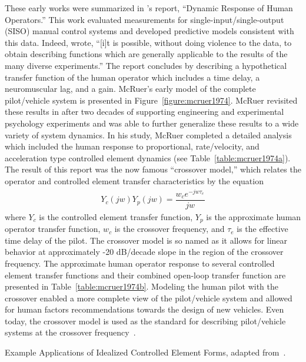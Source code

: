 These early works were summarized in \citeauthor{mcruer_dynamic_1957}'s report, ``Dynamic Response of Human Operators.''
This work evaluated measurements for single-input/single-output (SISO) manual control systems and developed predictive models consistent with this data.
Indeed, \citeauthor*{mcruer_dynamic_1957} wrote, ``[i]t is possible, without doing violence to the data, to obtain describing functions which are generally applicable to the results of the many diverse experiments.''
The report concludes by describing a hypothetical transfer function of the human operator which includes a time delay, a neuromuscular lag, and a gain.
McRuer's early model of the complete pilot/vehicle system is presented in Figure~\ref{figure:mcruer1974}.
McRuer revisited these results in \citeyear{mcruer_mathematical_1974} after two decades of supporting engineering and experimental psychology experiments and was able to further generalize these results to a wide variety of system dynamics.
In his study, McRuer completed a detailed analysis which included the human response to proportional, rate/velocity, and acceleration type controlled element dynamics (see Table~\ref{table:mcruer1974a}).
The result of this report was the now famous ``crossover model,'' which relates the operator and controlled element transfer characteristics by the equation
\begin{align}
    Y_c(jw) Y_p(jw) = \dfrac{w_c e^{-jw \tau_e}}{jw}
\end{align}
where $Y_c$ is the controlled element transfer function, $Y_p$ is the approximate human operator transfer function, $w_c$ is the crossover frequency, and $\tau_e$ is the effective time delay of the pilot.
The crossover model is so named as it allows for linear behavior at approximately -20 dB/decade slope in the region of the crossover frequency.
The approximate human operator response to several controlled element transfer functions and their combined open-loop transfer function are presented in Table~\ref{table:mcruer1974b}.
Modeling the human pilot with the crossover enabled a more complete view of the pilot/vehicle system and allowed for human factors recommendations towards the design of new vehicles.
Even today, the crossover model is used as the standard for describing pilot/vehicle systems at the crossover frequency~\citep{mcruer_human_1965, mcruer_mathematical_1974, xu_review_2017}.

\begin{table}[tb]
    \centering
    \caption[Example Applications of Idealized Controlled Element Forms]{Example Applications of Idealized Controlled Element Forms, adapted from~\citet{mcruer_mathematical_1974}.}
    \label{table:mcruer1974a}
\end{table}

